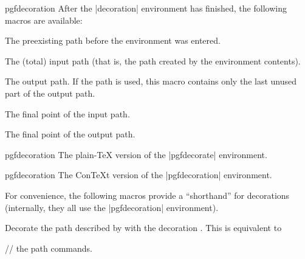 \begin{environment}{{pgfdecoration}}
  After the |{decoration}| environment has finished, the following 
  macros are available:
	
  \begin{command}{\pgfdecorateexistingpath}
    The preexisting path before the environment was entered.
  \end{command}
	
  \begin{command}{\pgfdecoratedpath}
    The (total) input path (that is, the path created by the environment contents).
  \end{command}
	
  \begin{command}{\pgfdecorationpath}
    The output path. If the path is used, this macro contains only the
    last unused part of the output path.
  \end{command}
	
  \begin{command}{\pgfpointdecoratedpathlast}
    The final point of the input path.
  \end{command}
  
  \begin{command}{\pgfpointdecorationpathlast}
    The final point of the output path.
  \end{command}
\end{environment}

\begin{plainenvironment}{{pgfdecoration}}
  The plain-\TeX{} version of the |{pgfdecorate}| environment.
\end{plainenvironment}

\begin{contextenvironment}{{pgfdecoration}}
  The Con\TeX t version of the |{pgfdecoration}| environment.
\end{contextenvironment}

For convenience, the following macros provide a ``shorthand''
for decorations (internally, they all use the |{pgfdecoration}|
environment).

\begin{command}{\pgfdecoratepath{}}
  Decorate the path described by  with the
  decoration . This is equivalent to
\begin{codeexample}
  // the path commands.
\endpgfdecorate    
\end{codeexample}
\end{command}

